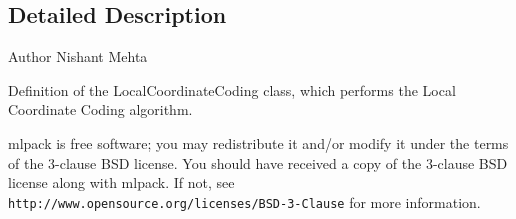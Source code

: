 \subsection{Detailed Description}
\begin{DoxyAuthor}{Author}
Nishant Mehta
\end{DoxyAuthor}
Definition of the Local\+Coordinate\+Coding class, which performs the Local Coordinate Coding algorithm.

mlpack is free software; you may redistribute it and/or modify it under the terms of the 3-\/clause B\+SD license. You should have received a copy of the 3-\/clause B\+SD license along with mlpack. If not, see {\tt http\+://www.\+opensource.\+org/licenses/\+B\+S\+D-\/3-\/\+Clause} for more information. 